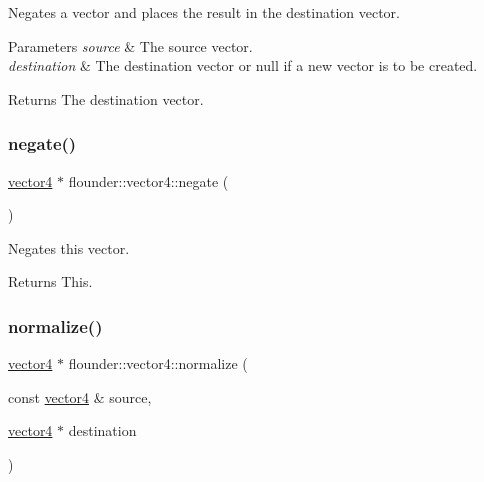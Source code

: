 Negates a vector and places the result in the destination vector. 


\begin{DoxyParams}{Parameters}
{\em source} & The source vector. \\
\hline
{\em destination} & The destination vector or null if a new vector is to be created. \\
\hline
\end{DoxyParams}
\begin{DoxyReturn}{Returns}
The destination vector. 
\end{DoxyReturn}
\mbox{\label{classflounder_1_1vector4_a024aa43916f5c77623010019e31c5791}} 
\subsubsection{\texorpdfstring{negate()}{negate()}\hspace{0.1cm}{\footnotesize\ttfamily [2/2]}}
{\footnotesize\ttfamily \hyperlink{classflounder_1_1vector4}{vector4} $\ast$ flounder\+::vector4\+::negate (\begin{DoxyParamCaption}{ }\end{DoxyParamCaption})}



Negates this vector. 

\begin{DoxyReturn}{Returns}
This. 
\end{DoxyReturn}
\mbox{\label{classflounder_1_1vector4_a9e6b492a08b3e69b63badb88dada1129}} 
\subsubsection{\texorpdfstring{normalize()}{normalize()}\hspace{0.1cm}{\footnotesize\ttfamily [1/2]}}
{\footnotesize\ttfamily \hyperlink{classflounder_1_1vector4}{vector4} $\ast$ flounder\+::vector4\+::normalize (\begin{DoxyParamCaption}\item[{const \hyperlink{classflounder_1_1vector4}{vector4} \&}]{source,  }\item[{\hyperlink{classflounder_1_1vector4}{vector4} $\ast$}]{destination }\end{DoxyParamCaption})\hspace{0.3cm}{\ttfamily [static]}}



